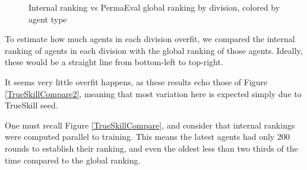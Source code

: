 \begin{figure}[H]
{}
\caption{Internal ranking vs PermaEval global ranking by division, colored by agent type}
\label{DivisionConsistency}
\end{figure}

To estimate how much agents in each division overfit, we compared the internal ranking of agents in each division with the global ranking of those agents. Ideally, these would be a straight line from bottom-left to top-right.

It seems very little overfit happens, as these results echo those of Figure \ref{TrueSkillCompare2}, meaning that most variation here is expected simply due to TrueSkill seed.

One must recall Figure \ref{TrueSkillCompare}, and consider that internal rankings were computed parallel to training. This means the latest agents had only 200 rounds to establish their ranking, and even the oldest less than two thirds of the time compared to the global ranking.